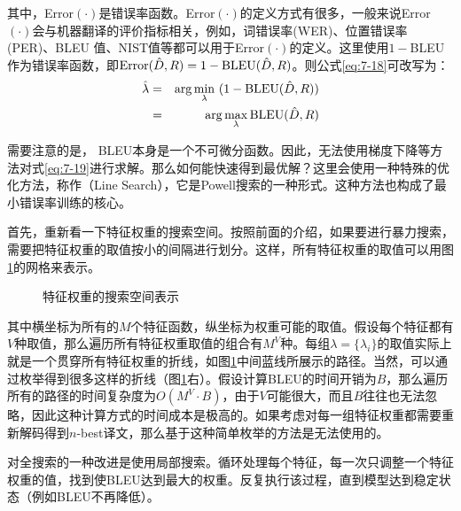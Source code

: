 \noindent 其中，\textrm{Error}$(\cdot)$是错误率函数。\textrm{Error}$(\cdot)$的定义方式有很多，一般来说\textrm{Error}$(\cdot)$会与机器翻译的评价指标相关，例如，词错误率(WER)、位置错误率(PER)、BLEU 值、NIST值等都可以用于\textrm{Error}$(\cdot)$的定义。这里使用$1-$BLEU作为错误率函数，即$\textrm{Error}(\hat{{D}},{R}) = 1 - \textrm{BLEU}(\hat{{D}},{R})$。则公式\eqref{eq:7-18}可改写为：
\begin{eqnarray}
\hat{\lambda} &=& \arg\min_{\lambda}\ (1 - \textrm{BLEU}(\hat{{D}},{R}))   \nonumber \\
&=& \arg\max_{\lambda} \textrm{BLEU}(\hat{{D}},{R})
\label{eq:7-19}
\end{eqnarray}

\parinterval 需要注意的是， BLEU本身是一个不可微分函数。因此，无法使用梯度下降等方法对式\eqref{eq:7-19}进行求解。那么如何能快速得到最优解？这里会使用一种特殊的优化方法，称作{\small{}}（Line Search），它是Powell搜索的一种形式。这种方法也构成了最小错误率训练的核心。

\parinterval 首先，重新看一下特征权重的搜索空间。按照前面的介绍，如果要进行暴力搜索，需要把特征权重的取值按小的间隔进行划分。这样，所有特征权重的取值可以用图\ref{fig:7-20}的网格来表示。

\begin{figure}[htp]
\centering

\caption{特征权重的搜索空间表示}
\label{fig:7-20}
\end{figure}

\parinterval 其中横坐标为所有的$M$个特征函数，纵坐标为权重可能的取值。假设每个特征都有$V$种取值，那么遍历所有特征权重取值的组合有$M^V$种。每组$\lambda = \{\lambda_i\}$的取值实际上就是一个贯穿所有特征权重的折线，如图\ref{fig:7-20}中间蓝线所展示的路径。当然，可以通过枚举得到很多这样的折线（图\ref{fig:7-20}右）。假设计算BLEU的时间开销为$B$，那么遍历所有的路径的时间复杂度为$O(M^V \cdot B)$，由于$V$可能很大，而且$B$往往也无法忽略，因此这种计算方式的时间成本是极高的。如果考虑对每一组特征权重都需要重新解码得到$n$-best译文，那么基于这种简单枚举的方法是无法使用的。

\parinterval 对全搜索的一种改进是使用局部搜索。循环处理每个特征，每一次只调整一个特征权重的值，找到使BLEU达到最大的权重。反复执行该过程，直到模型达到稳定状态（例如BLEU不再降低）。

